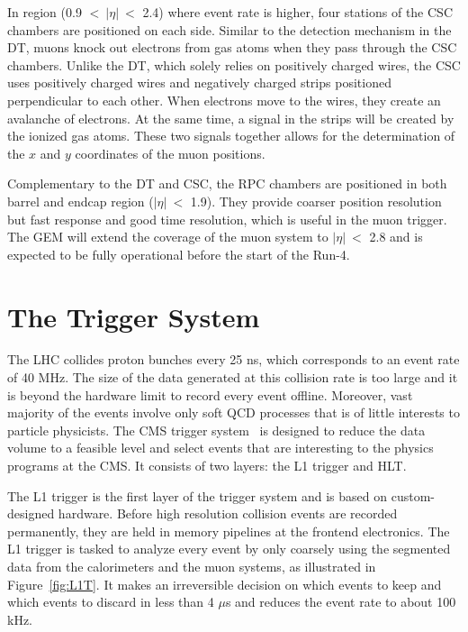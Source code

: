 In region (0.9 $<~|\eta|~<$ 2.4) where event rate is higher, four stations of the \ac{CSC} chambers are positioned on each side. Similar to the detection mechanism in the \ac{DT}, muons knock out electrons from gas atoms when they pass through the \ac{CSC} chambers. Unlike the \ac{DT}, which solely relies on positively charged wires, the \ac{CSC} uses positively charged wires and negatively charged strips positioned perpendicular to each other. When electrons move to the wires, they create an avalanche of electrons. At the same time, a signal in the strips will be created by the ionized gas atoms. These two signals together allows for the determination of the $x$ and $y$ coordinates of the muon positions. 

Complementary to the \ac{DT} and \ac{CSC}, the \ac{RPC} chambers are positioned in both barrel and endcap region ($|\eta|~<$ 1.9). They provide coarser position resolution but fast response and good time resolution, which is useful in the muon trigger. The \ac{GEM} will extend the coverage of the muon system to $|\eta|~<$ 2.8 and is expected to be fully operational before the start of the Run-4. 

\section{The Trigger System}
\label{sec:TrigSys}
 
The \ac{LHC} collides proton bunches every 25 ns, which corresponds to an event rate of 40 MHz. The size of the data generated at this collision rate is too large and it is beyond the hardware limit to record every event offline. Moreover, vast majority of the events involve only soft \ac{QCD} processes that is of little interests to particle physicists. The \ac{CMS} trigger system~\cite{CMS:2016ngn} is designed to reduce the data volume to a feasible level and select events that are interesting to the physics programs at the \ac{CMS}. It consists of two layers: the \ac{L1} trigger and \ac{HLT}.

The \ac{L1} trigger is the first layer of the trigger system and is based on custom-designed hardware. Before high resolution collision events are recorded permanently, they are held in memory pipelines at the frontend electronics. The \ac{L1} trigger is tasked to analyze every event by only coarsely using the segmented data from the calorimeters and the muon systems, as illustrated in Figure~\ref{fig:L1T}. It makes an irreversible decision on which events to keep and which events to discard in less than 4 $\mu$s and reduces the event rate to about 100 kHz.

